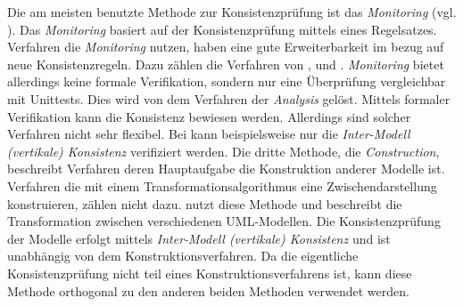 Die am meisten benutzte Methode zur Konsistenzprüfung ist das \emph{Monitoring} (vgl. \cite{Usman2008}).
Das \emph{Monitoring} basiert auf der Konsistenzprüfung mittels eines Regelsatzes. 
Verfahren die \emph{Monitoring} nutzen, haben eine gute Erweiterbarkeit im bezug auf neue Konsistenzregeln.
Dazu zählen die Verfahren von \cite{Rasch2003}, \cite{Mens2005} und \cite{Egyed2006}.
\emph{Monitoring} bietet allerdings keine formale Verifikation, sondern nur eine Überprüfung vergleichbar mit Unittests.
Dies wird von dem Verfahren der \emph{Analysis} gelöst.
Mittels formaler Verifikation kann die Konsistenz bewiesen werden.
Allerdings sind solcher Verfahren nicht sehr flexibel.
Bei \cite{Shinkawa2006} kann beispielsweise nur die \emph{Inter-Modell (vertikale) Konsistenz} verifiziert werden.
Die dritte Methode, die \emph{Construction}, beschreibt Verfahren deren Hauptaufgabe die Konstruktion anderer Modelle ist.
Verfahren die mit einem Transformationsalgorithmus eine Zwischendarstellung konstruieren, zählen nicht dazu.
\cite{Egyed2001} nutzt diese Methode und beschreibt die Transformation zwischen verschiedenen UML-Modellen.
Die Konsistenzprüfung der Modelle erfolgt mittels \emph{Inter-Modell (vertikale) Konsistenz} und ist unabhängig von dem Konstruktionsverfahren.
Da die eigentliche Konsistenzprüfung nicht teil eines Konstruktionsverfahrens ist, kann diese Methode orthogonal zu den anderen beiden Methoden verwendet werden.
